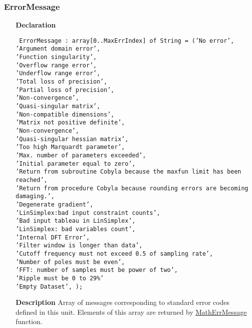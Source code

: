 \documentclass[12pt,a4paper,oneside]{report}
\newcommand{\lmath}[1]{   %
	\marginpar{\vspace{#1} 
		\begin{flushright}
			LMath
	\end{flushright} }
}
\newcommand{\declarationitem}[1]{\textbf{#1}}
\newcommand{\descriptiontitle}[1]{\textbf{#1}}
\newcommand{\code}[1]{\texttt{#1}}
\begin{document}
\subsubsection{ErrorMessage}
\lmath{-24pt}
\label{uErrors-ErrorMessage}
\begin{itemize}\item[\declarationitem{Declaration}\hfill]
	\begin{flushleft}
		\code{
			ErrorMessage : array[0..MaxErrIndex] of String =
			('No error',\\
			'Argument domain error',\\
			'Function singularity',\\
			'Overflow range error',\\
			'Underflow range error',\\
			'Total loss of precision',\\
			'Partial loss of precision',\\
			'Non-convergence',\\
			'Quasi-singular matrix',\\
			'Non-compatible dimensions',\\
			'Matrix not positive definite',\\
			'Non-convergence',\\
			'Quasi-singular hessian matrix',\\
			'Too high Marquardt parameter',\\
			'Max. number of parameters exceeded',\\
			'Initial parameter equal to zero',\\
     		'Return from subroutine Cobyla because the maxfun limit has been reached',\\
			'Return from procedure Cobyla because rounding errors are becoming damaging.',\\
			'Degenerate gradient',\\
			'LinSimplex:bad input constraint counts',\\
			'Bad input tableau in LinSimplex',\\
			'LinSimplex: bad variables count',\\
			     'Internal DFT Error',\\
			'Filter window is longer than data',\\
			'Cutoff frequency must not exceed 0.5 of sampling rate',\\
			'Number of poles must be even',\\
			'FFT: number of samples must be power of two',\\
			'Ripple must be 0 to 29\%'\\
			'Empty Dataset',
			);}
	\end{flushleft}
\item[\descriptiontitle{Description}] Array of messages corresponding to standard error codes defined in this unit. Elements of this array are returned by \hyperref[uErrors-MathErrMessage]{MathErrMessage} function.	
\end{itemize}
\end{document}
